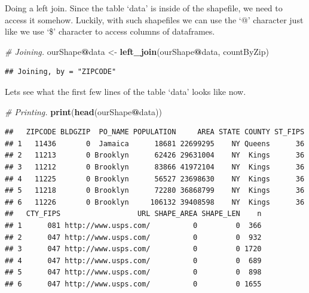\documentclass[]{book}
\newenvironment{Shaded}{\begin{snugshade}}{\end{snugshade}}
\newcommand{\CommentTok}[1]{\textcolor[rgb]{0.56,0.35,0.01}{\textit{#1}}}
\newcommand{\KeywordTok}[1]{\textcolor[rgb]{0.13,0.29,0.53}{\textbf{#1}}}
\newcommand{\NormalTok}[1]{#1}
\newcommand{\OperatorTok}[1]{\textcolor[rgb]{0.81,0.36,0.00}{\textbf{#1}}}
\newcommand{\StringTok}[1]{\textcolor[rgb]{0.31,0.60,0.02}{#1}}
\begin{document}
Doing a left join. Since the table `data' is inside of the shapefile, we need to access it somehow. Luckily, with such shapefiles we can use the `@' character just like we use `\$' character to access columns of dataframes.

\begin{Shaded}
\begin{Highlighting}[]
\CommentTok{# Joining.}
\NormalTok{ourShape}\OperatorTok{@}\NormalTok{data <-}\StringTok{ }\KeywordTok{left_join}\NormalTok{(ourShape}\OperatorTok{@}\NormalTok{data, countByZip)}
\end{Highlighting}
\end{Shaded}

\begin{verbatim}
## Joining, by = "ZIPCODE"
\end{verbatim}

Lets see what the first few lines of the table `data' looks like now.

\begin{Shaded}
\begin{Highlighting}[]
\CommentTok{# Printing.}
\KeywordTok{print}\NormalTok{(}\KeywordTok{head}\NormalTok{(ourShape}\OperatorTok{@}\NormalTok{data))}
\end{Highlighting}
\end{Shaded}

\begin{verbatim}
##   ZIPCODE BLDGZIP  PO_NAME POPULATION     AREA STATE COUNTY ST_FIPS
## 1   11436       0  Jamaica      18681 22699295    NY Queens      36
## 2   11213       0 Brooklyn      62426 29631004    NY  Kings      36
## 3   11212       0 Brooklyn      83866 41972104    NY  Kings      36
## 4   11225       0 Brooklyn      56527 23698630    NY  Kings      36
## 5   11218       0 Brooklyn      72280 36868799    NY  Kings      36
## 6   11226       0 Brooklyn     106132 39408598    NY  Kings      36
##   CTY_FIPS                  URL SHAPE_AREA SHAPE_LEN    n
## 1      081 http://www.usps.com/          0         0  366
## 2      047 http://www.usps.com/          0         0  932
## 3      047 http://www.usps.com/          0         0 1720
## 4      047 http://www.usps.com/          0         0  689
## 5      047 http://www.usps.com/          0         0  898
## 6      047 http://www.usps.com/          0         0 1655
\end{verbatim}
\end{document}
